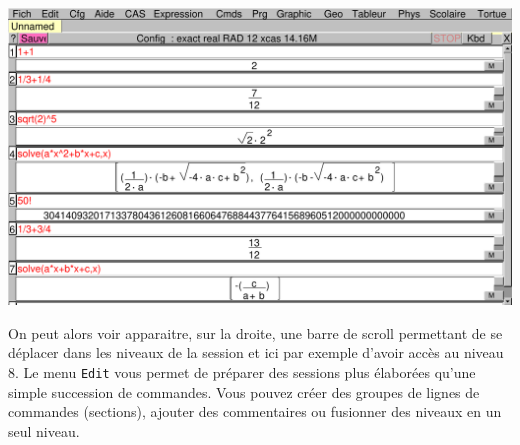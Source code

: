 \documentclass{article}
\begin{document}
\begin{giacjshere}
\centerline{
\includegraphics[width=\textwidth]{ecran2}
}
On peut alors voir apparaitre, sur la droite, une barre de scroll permettant de 
se d\'eplacer dans les niveaux de la session et ici par exemple d'avoir 
acc\`es au niveau 8.
Le menu \verb|Edit| vous permet de pr\'eparer des sessions plus
\'elabor\'ees qu'une simple succession de commandes. Vous pouvez
cr\'eer des groupes de lignes de commandes (sections), 
ajouter des commentaires ou fusionner des niveaux en un seul niveau.
%

\end{giacjshere}
\end{document}
